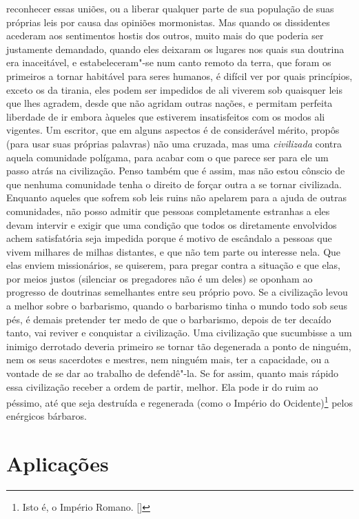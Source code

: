 reconhecer essas uniões, ou a liberar qualquer parte de sua população
de suas próprias leis por causa das opiniões mormonistas. Mas quando os
dissidentes acederam aos sentimentos hostis dos outros, muito mais do
que poderia ser justamente demandado, quando eles deixaram os lugares
nos quais sua doutrina era inaceitável, e estabeleceram"-se num canto
remoto da terra, que foram os primeiros a tornar habitável para seres
humanos, é difícil ver por quais princípios, exceto os da tirania, eles
podem ser impedidos de ali viverem sob quaisquer leis que lhes agradem,
desde que não agridam outras nações, e permitam perfeita liberdade de
ir embora àqueles que estiverem insatisfeitos com os modos ali
vigentes. Um escritor, que em alguns aspectos é de considerável mérito,
propôs (para usar suas próprias palavras) não uma cruzada, mas uma
\textit{civilizada} contra aquela comunidade polígama, para acabar com
o que parece ser para ele um passo atrás na civilização. Penso também
que é assim, mas não estou cônscio de que nenhuma comunidade tenha o
direito de forçar outra a se tornar civilizada. Enquanto aqueles que
sofrem sob leis ruins não apelarem para a ajuda de outras
comunidades, não posso admitir que pessoas completamente estranhas a
eles devam intervir e exigir que uma condição que todos
os diretamente envolvidos achem satisfatória seja impedida porque é
motivo de escândalo a pessoas que vivem milhares de milhas distantes, e
que não tem parte ou interesse nela. Que elas enviem missionários, se
quiserem, para pregar contra a situação e que elas, por meios justos
(silenciar os pregadores não é um deles) se oponham ao
progresso de doutrinas semelhantes entre seu próprio povo. Se a
civilização levou a melhor sobre o barbarismo, quando o barbarismo
tinha o mundo todo sob seus pés, é demais pretender ter medo de que o
barbarismo, depois de ter decaído tanto, vai reviver e conquistar a
civilização. Uma civilização que sucumbisse a um inimigo derrotado
deveria primeiro se tornar tão degenerada a ponto de ninguém, nem os
seus sacerdotes e mestres, nem ninguém mais, ter a capacidade, ou a
vontade de se dar ao trabalho de defendê"-la. Se for assim, quanto mais
rápido essa civilização receber a ordem de partir, melhor. Ela pode ir
do ruim ao péssimo, até que seja destruída e regenerada (como o Império do
Ocidente)\footnote{ Isto é, o Império Romano. []} pelos enérgicos bárbaros. 

\chapter{Aplicações}

